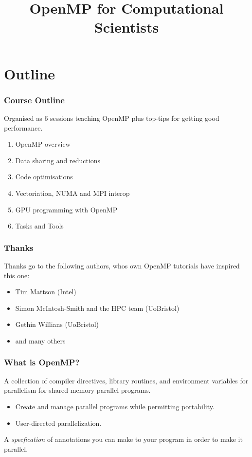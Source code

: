\documentclass{beamer}
\title{OpenMP for Computational Scientists}
\begin{document}
\frame{\titlepage}

\section{Outline}
\begin{frame}
\frametitle{Course Outline}
Organised as 6 sessions teaching OpenMP plus top-tips for getting good performance.
\begin{enumerate}
  \item OpenMP overview
  \item Data sharing and reductions
  \item Code optimisations
  \item Vectoriation, NUMA and MPI interop
  \item GPU programming with OpenMP
  \item Tasks and Tools
\end{enumerate}
\end{frame}

\begin{frame}
\frametitle{Thanks}
Thanks go to the following authors, whos own OpenMP tutorials have inspired this one:
\begin{itemize}
  \item Tim Mattson (Intel)
  \item Simon McIntosh-Smith and the HPC team (UoBristol)
  \item Gethin Willians (UoBristol)
  \item and many others
\end{itemize}
\end{frame}

\begin{frame}
\frametitle{What is OpenMP?}

A collection of compiler directives, library routines, and environment variables for parallelism for shared memory parallel programs.

\begin{itemize}
  \item Create and manage parallel programs while permitting portability.
  \item User-directed parallelization.
\end{itemize}

A \emph{specfication} of annotations you can make to your program in order to make it parallel.

\end{frame}
\end{document}

